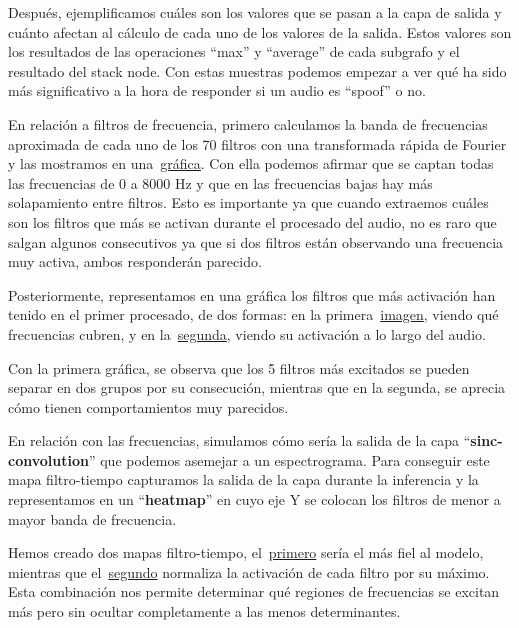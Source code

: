 Después,  ejemplificamos cuáles son los valores que se pasan a la capa de salida y cuánto afectan al cálculo de cada uno de los valores de la salida. Estos valores son los resultados de las operaciones ``max'' y ``average'' de cada subgrafo y el resultado del stack node. Con estas muestras podemos empezar a ver qué ha sido más significativo a la hora de responder si un audio es ``spoof'' o no.

En relación a filtros de frecuencia, primero calculamos la banda de frecuencias aproximada de cada uno de los 70 filtros con una transformada rápida de Fourier y las mostramos en una~\href{https://github.com/NILGroup/tfg-2526-xplicavoz/blob/main/Memoria/imagenes/AASIST_bandasf_filtros.png}{gráfica}. Con ella podemos afirmar que se captan todas las frecuencias de 0 a 8000 Hz y que en las frecuencias bajas hay más solapamiento entre filtros. Esto es importante ya que cuando extraemos cuáles son los filtros que más se activan durante el procesado del audio, no es raro que salgan algunos consecutivos ya que si dos filtros están observando una frecuencia muy activa, ambos responderán parecido.

Posteriormente, representamos en una gráfica los filtros que más activación han tenido en el primer procesado, de dos formas: en la primera~\href{https://github.com/NILGroup/tfg-2526-xplicavoz/blob/main/Memoria/imagenes/AASIST_top_filtros.png}{imagen}, viendo qué frecuencias cubren, y en la~\href{https://github.com/NILGroup/tfg-2526-xplicavoz/blob/main/Memoria/imagenes/AASIST_activación_top_filtros.png}{segunda}, viendo su activación a lo largo del audio.

Con la primera gráfica, se observa que los 5 filtros más excitados se pueden separar en dos grupos por su consecución, mientras que en la segunda, se aprecia cómo tienen comportamientos muy parecidos. 

En relación con las frecuencias, simulamos cómo sería la salida de la capa ``\textbf{sinc-convolution}'' que podemos asemejar a un espectrograma. Para conseguir este mapa filtro-tiempo capturamos la salida de la capa durante la inferencia y la representamos en un ``\textbf{heatmap}'' en cuyo eje Y se colocan los filtros de menor a mayor banda de frecuencia. 

Hemos creado dos mapas filtro-tiempo, el~\href{https://github.com/NILGroup/tfg-2526-xplicavoz/blob/main/Memoria/imagenes/AASIST_heatmap.png}{primero} sería el más fiel al modelo, mientras que el~\href{https://github.com/NILGroup/tfg-2526-xplicavoz/blob/main/Memoria/imagenes/AASIST_heatmap_normalizado.png}{segundo} normaliza la activación de cada filtro por su máximo. Esta combinación nos permite determinar qué regiones de frecuencias se excitan más pero sin ocultar completamente a las menos determinantes.

